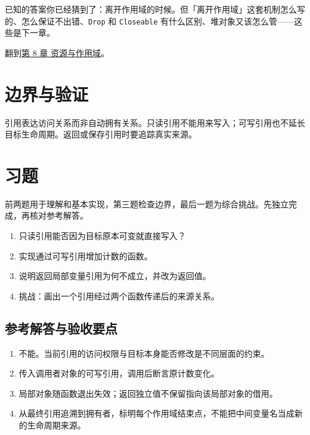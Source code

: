 已知的答案你已经猜到了：离开作用域的时候。但「离开作用域」这套机制怎么写的、怎么保证不出错、\texttt{Drop} 和 \texttt{Closeable} 有什么区别、堆对象又该怎么管——这些是下一章。

翻到\hyperref[ch:08]{第 8 章 资源与作用域}。

\section{边界与验证}

引用表达访问关系而非自动拥有关系。只读引用不能用来写入；可写引用也不延长目标生命周期。返回或保存引用时要追踪真实来源。

\section{习题}

前两题用于理解和基本实现，第三题检查边界，最后一题为综合挑战。先独立完成，再核对参考解答。

\begin{enumerate}

\item 只读引用能否因为目标原本可变就直接写入？

\item 实现通过可写引用增加计数的函数。

\item 说明返回局部变量引用为何不成立，并改为返回值。

\item 挑战：画出一个引用经过两个函数传递后的来源关系。

\end{enumerate}

\subsection*{参考解答与验收要点}

\begin{enumerate}

\item 不能。当前引用的访问权限与目标本身能否修改是不同层面的约束。

\item 传入调用者对象的可写引用，调用后断言原计数变化。

\item 局部对象随函数退出失效；返回独立值不保留指向该局部对象的借用。

\item 从最终引用追溯到拥有者，标明每个作用域结束点，不能把中间变量名当成新的生命周期来源。

\end{enumerate}

